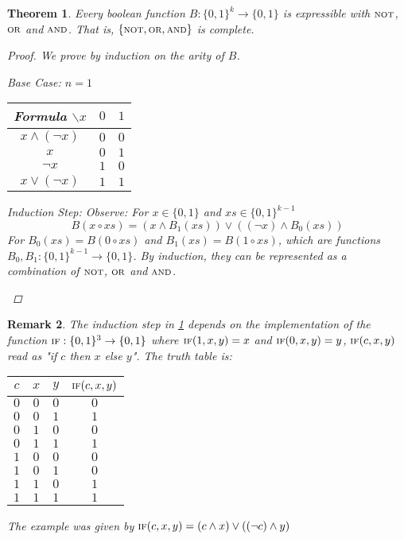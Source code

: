 \documentclass[12pt]{article}
\let\aand\wedge
\let\oor\vee
\newcommand{\scr}[1]{{\scriptstyle\textup{#1}}}
\DeclareMathOperator{\NOT}{\scr{NOT}}
\DeclareMathOperator{\OR}{\scr{OR}}
\DeclareMathOperator{\AND}{\scr{AND}}
\newcommand*{\B}{\{0,1\}}
\newtheorem{theorem}{Theorem}[subsection]
\newtheorem{remark}[theorem]{Remark}
\begin{document}
\begin{theorem}
  \label{basic_connectives}
  Every boolean function $B:\B^k\to\B$ is expressible with $\NOT$, $\OR$ and $\AND$. That is, $\{\NOT,\OR,\AND\}$ is complete.
  \begin{proof}
    We prove by induction on the arity of $B$.
    \begin{compactitem}
      \item Base Case: $n=1$ \begin{table}[H]
        \centering
        \begin{tabular}{c||c|c}
          Formula $\backslash x$ & $0$ & $1$\\\hline\hline
          $x\aand(\neg x)$ & $0$ & $0$\\
          $x$ & $0$ & $1$\\
          $\neg x$ & $1$ & $0$\\
          $x\oor(\neg x)$ & $1$ & $1$
        \end{tabular}
      \end{table}
      \item Induction Step: Observe: For $x\in\B$ and $xs\in\B^{k-1}$ $$B(x\circ xs)=(x\aand B_1(xs))\oor((\neg x)\aand B_0(xs))$$ For $B_0(xs)=B(0\circ xs)$ and $B_1(xs)=B(1\circ xs)$, which are functions $B_0,B_1:\B^{k-1}\to\B$. By induction, they can be represented as a combination of $\NOT$, $\OR$ and $\AND$.
    \end{compactitem}
  \end{proof}
\end{theorem}

\begin{remark}
  \label{if_Fn}
  The induction step in \ref{basic_connectives} depends on the implementation of the function $\scr{IF}:\B^3\to\B$ where $\scr{IF}(1,x,y)=x$ and $\scr{IF}(0,x,y)=y$, $\scr{IF}(c,x,y)$ read as "if $c$ then $x$ else $y$". The truth table is:
  \begin{table}[H]
    \centering
    \begin{tabular}{c|c|c||c}
      $c$ & $x$ & $y$ & $\scr{IF}(c,x,y)$\\\hline
      $0$ & $0$ & $0$ & $0$\\
      $0$ & $0$ & $1$ & $1$\\
      $0$ & $1$ & $0$ & $0$\\
      $0$ & $1$ & $1$ & $1$\\
      $1$ & $0$ & $0$ & $0$\\
      $1$ & $0$ & $1$ & $0$\\
      $1$ & $1$ & $0$ & $1$\\
      $1$ & $1$ & $1$ & $1$\\
    \end{tabular}
  \end{table}

  \noindent The example was given by $\scr{IF}(c,x,y)=(c\aand x)\oor((\neg c)\aand y)$
\end{remark}
\end{document}

